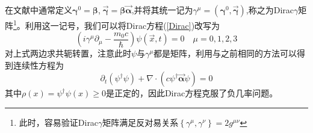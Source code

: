在文献中通常定义$\pmb{\gamma}^{0}=\pmb{\beta}$,$\;\vec{\pmb{\gamma}}=\pmb{\beta}\vec{\pmb{\alpha}}$,并将其统一记为$\gamma^{\mu}=(\pmb{\gamma}^{0},\vec{\pmb{\gamma}})$,称之为Dirac$\gamma$矩阵\footnote{此时，容易验证Dirac$\gamma$矩阵满足反对易关系$\left\{\gamma^{\mu},\gamma^{\nu}\right\}=2g^{\mu \nu}$}。利用这一记号，我们可以将Dirac方程(\ref{Dirac})改写为
\begin{equation}
    (i \gamma^{\mu}\partial_{\mu}-\frac{m_{0}c}{\hbar})\psi(\vec{x},t)=0 \quad \mu=0,1,2,3
\end{equation}
对上式两边求共轭转置，注意此时$\psi$与$\gamma^{\mu}$都是矩阵，利用与之前相同的方法可以得到连续性方程为
\begin{equation}
    \partial_{t}(\psi^{\dagger}\psi)+\nabla \cdot(c \psi^{\dagger}\vec{\pmb{\alpha}}\psi)=0
\end{equation}
其中$\rho(x)=\psi^{\dagger}\psi(x) \geq0$是正定的，因此Dirac方程克服了负几率问题。

